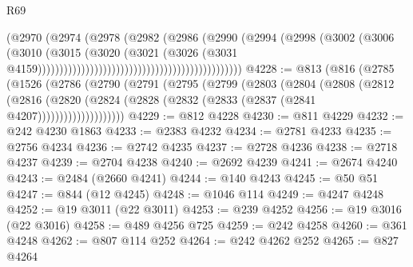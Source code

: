 \begin{lexlean}{R69}
\begin{coremodule}
{                                                                  (@2970
                                                                    (@2974
                                                                      (@2978
                                                                        (@2982
                                                                          (@2986
                                                                            (@2990
                                                                              (@2994
                                                                                (@2998
                                                                                  (@3002
                                                                                    (@3006
                                                                                      (@3010
                                                                                        (@3015
                                                                                          (@3020
                                                                                            (@3021
                                                                                              (@3026
                                                                                                (@3031
                                                                                                  @4159)))))))))))))))))))))))))))))))))))))))))))))))
@4228 := @813
    (@816
      (@2785
        (@1526
          (@2786
            (@2790
              (@2791
                (@2795
                  (@2799
                    (@2803
                      (@2804
                        (@2808
                          (@2812
                            (@2816
                              (@2820
                                (@2824 (@2828 (@2832 (@2833 (@2837 (@2841 @4207))))))))))))))))))))
@4229 := @812 @4228
@4230 := @811 @4229
@4232 := @242 @4230 @1863
@4233 := @2383 @4232
@4234 := @2781 @4233
@4235 := @2756 @4234
@4236 := @2742 @4235
@4237 := @2728 @4236
@4238 := @2718 @4237
@4239 := @2704 @4238
@4240 := @2692 @4239
@4241 := @2674 @4240
@4243 := @2484 (@2660 @4241)
@4244 := @140 @4243
@4245 := @50 @51
@4247 := @844 (@12 @4245)
@4248 := @1046 @114
@4249 := @4247 @4248
@4252 := @19 @3011 (@22 @3011)
@4253 := @239 @4252
@4256 := @19 @3016 (@22 @3016)
@4258 := @489 @4256 @725
@4259 := @242 @4258
@4260 := @361 @4248
@4262 := @807 @114 @252
@4264 := @242 @4262 @252
@4265 := @827 @4264
}
\end{coremodule}
\end{lexlean}

